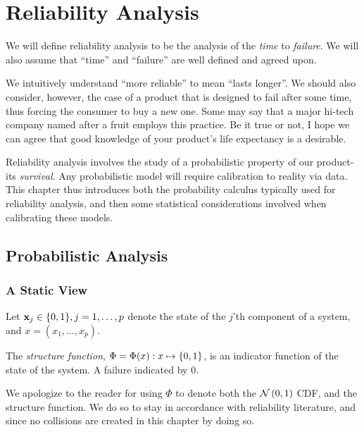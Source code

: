 \chapter{Reliability Analysis}

We will define reliability analysis to be the analysis of the \emph{time} to \emph{failure}.
We will also assume that ``time'' and ``failure'' are well defined and agreed upon.

We intuitively understand ``more reliable'' to mean ``lasts longer''. 
We should also consider, however, the case of a product that is designed to fail after some time, thus forcing the consumer to buy a new one. 
Some may say that a major hi-tech company named after a fruit employs this practice. 
Be it true or not, I hope we can agree that good knowledge of your product's life expectancy is a desirable. 

Reliability analysis involves the study of a probabilistic property of our product- its \emph{survival}.
Any probabilistic model will require calibration to reality via data. 
This chapter thus introduces both the probability calculus typically used for reliability analysis, and then some statistical considerations involved when calibrating these models.



\section{Probabilistic Analysis}




\subsection{A Static View}

Let $\mathbf{x}_j \in \{ 0,1 \}, j=1,\dots,p$ denote the state of the $j$'th component of a system, and $x=(x_1,\dots,x_p)$.

\begin{definition}
The \emph{structure function}, $\Phi=\Phi(x):x \mapsto \{ 0,1 \}$, is an indicator function of the state of the system. A failure indicated by $0$. 
\end{definition}

\begin{remark}[$\Phi$]
We apologize to the reader for using $\Phi$ to denote both the $\mathcal{N}\left(0,1\right)$ CDF, and the structure function.
We do so to stay in accordance with reliability literature, and since no collisions are created in this chapter by doing so.
\end{remark}

